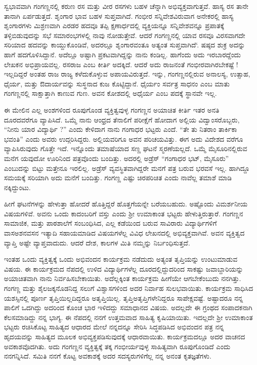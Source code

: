 {ಸ್ವಭಾವವಾಗಿ ಗಂಗಣ್ಣನಲ್ಲಿ ಕರುಣ ರಸ ಮತ್ತು ವೀರ ರಸಗಳು ಬಹಳ ಚೆನ್ನಾಗಿ ಅಭಿವ್ಯಕ್ತವಾಗುತ್ತವೆ. ಹಾಸ್ಯ ರಸ ತಾನೇ ತಾನಾಗಿ ಏರ್ಪಡುತ್ತದೆ. ಶೃಂಗಾರ ಭಾವ ಬಹಳ ಸುಪ್ತವಾಗಿದೆ. ಗಂಭೀರ ಸನ್ನಿವೇಶವಿರುವಾಗ ಅನೇಕರಲ್ಲಿ ಹಾಸ್ಯ ಶೃಂಗಾರಗಳು ಮಿಶ್ರಣವಾಗಿ ಎರಡರ ಹದವೂ ತಪ್ಪಿ ಕ್ಷಣಾರ್ಧದಲ್ಲಿ ವ್ಯಕ್ತಿಯನ್ನೂ ಸನ್ನಿವೇಶವನ್ನೂ ಪ್ರಪಾತಕ್ಕೆ ತಳ್ಳಿಬಿಡುವುದನ್ನು  ಸಭೆ ಸಮಾರಂಭಗಳಲ್ಲಿ ನಾವು ನೋಡುತ್ತೇವೆ. ಆದರೆ ಗಂಗಣ್ಣನಲ್ಲಿ ಯಾವ ರಸವೂ ವಿರಸವಾಗದೇ ಸರಿಯಾದ ಹದವನ್ನು ಕಾಯ್ದುಕೊಂಡಿವೆ, ಅದರಲ್ಲೂ ಶೃಂಗಾರವಂತೂ ಅತ್ಯಂತ ಸುಪ್ತವಾಗಿದೆ‘. ಷಷ್ಠದ ಶುಕ್ರ ಅದನ್ನು ಹಾಗೆ ಹದಗೊಳಿಸಿದ್ದಾನೆ.  ಅದೆಲ್ಲೂ ಅಷ್ಟಾಗಿ ಪ್ರಕಟವಾಗಿದ್ದನ್ನು ನಾನು ಕಂಡಿಲ್ಲ. ಹಾಗೆಂದು ಅದು ಇರಬಾರದ್ದೆಂದು ಲೇಖಕನ ಅಭಿಪ್ರಾಯವಲ್ಲ. ರಸರಾಜ ಎಂಬ ಕೀರ್ತಿ ಅದಕ್ಕಿದೆ. ಆದರೆ ಅದು ರಾಜನಂತೆ ಗಂಭೀರವಾಗಿರಬೇಕಷ್ಟೆ ! ಇಲ್ಲದಿದ್ದರೆ ಅಂತಹ ರಾಜ ರಾಜ್ಯ ಕಳೆದುಕೊಳ್ಳುವ ಅಪಾಯವಿರುತ್ತದೆ. ಇನ್ನು, ಗಂಗಣ್ಣನಲ್ಲಿರುವ ಅನಾಲಸ್ಯ, ಉತ್ಸಾಹ, ಧೈರ್ಯ, ಮತ್ತು ಔದಾರ್ಯವನ್ನು ಸುಸ್ಥನಾದ ಕುಜ ಕೊಟ್ಟಿದ್ದಾನೆ. ಧೈರ್ಯಂ ಸರ್ವತ್ರ ಸಾಧನಂ ಎಂಬ ಮಾತು ಗಂಗಣ್ಣನಲ್ಲಿ ಸಾಕ್ಷಾತ್ತಾಗಿ ಕಾಣುವ ಗುಣ. ಅವನ ಕೋಶದಲ್ಲಿ ಅಧೈರ್ಯ ಎಂಬ ಪದಕ್ಕೆ ಸ್ಥಾನವೇ ಇಲ್ಲ. 

ಈ ಮೇಲಿನ ಎಲ್ಲ ಅಂಶಗಳಿಂದ ರೂಪುಗೊಂಡ ವ್ಯಕ್ತಿತ್ವವುಳ್ಳ ಗಂಗಣ್ಣನ ಅಯಾಚಿತ ಕೀರ್ತಿ ಇತರ ಅನತಿ ದೂರದವರೆಗೂ ವ್ಯಾಪಿಸಿದೆ. ಒಮ್ಮೆ ನಾನು ಆಂಧ್ರದ ತೆನಾಲಿಗೆ ಪರೀಕ್ಷೆಗೆ ಹೋದಾಗ ಅಲ್ಲಿಯ ವಿದ್ವಾಂಸರೊಬ್ಬರು, “ನೀನು ಯಾರ ವಿದ್ಯಾರ್ಥಿ ?” ಎಂದು ಕೇಳಿದಾಗ ನಾನು ಗಂಗಾಧರ ಭಟ್ಟರು ಎಂದೆ. “ತೇ ತು ನಿತರಾಂ ತಾರ್ಕಿಕಾ ಭವಂತಿ” ಎಂದು ಅವರು ಉದ್ಗರಿಸಿದ್ದರು. ಅಲ್ಲಿಯವರಿಗೂ ಅವನ ಪರಿಚಯವಿತ್ತು. ಈಗ ಅದು ವಿದೇಶದ ವರೆಗೂ ವ್ಯಾಪಿಸಿರುವುದು ಗೊತ್ತೇ ಇದೆ.  ಇನ್ನೊಂದು ತಮಾಷೆಯಾದ ಸಣ್ಣ ಘಟನೆ ಸ್ಮರಣೆಯಲ್ಲದೆ. ಒಮ್ಮೆ ಮೈಸೂರಿನಲ್ಲಿರುವ ಮನೆಗ ಯವುದೋ ಊರಿನಿಂದ ಪತ್ರವೊಂದು ಬಂದಿತ್ತು. ಅದರಲ್ಲಿ ಅಡ್ರೆಸ್ \enginline{-} “ಗಂಗಾಧರ ಭಟ್, ಮೈಸೂರು” ಎಂಬುದನ್ನು ಬಿಟ್ಟು ಮತ್ತೇನೂ ಇರಲಿಲ್ಲ.  ಅಡ್ರೆಸ್ ವ್ಯವಸ್ಥಿತವಾಗಿದ್ದರೇ ಮನಗೆ ಪತ್ರ ಬರುವ ಭರವಸೆ ಇಲ್ಲ. ಹಾಗಿದ್ದೂ ಸಮಯಕ್ಕೆ ಸರಿಯಾಗಿ ಅದು ಮನೆಗೆ ಬಂದಿತ್ತು. ಗಂಗಣ್ಣ ಎಷ್ಟು ಚಿರಪರಿಚಿತ ಎಂದು ನಾವೆಲ್ಲ ತಮಾಶೆ ಮಾಡಿ ನಕ್ಕಿದ್ದುಂಟು. 

ಹೀಗೆ ಘಟನೆಗಳನ್ನು ಹೇಳುತ್ತಾ ಹೋದರೆ ಹೊತ್ತಿದ್ದರೆ ಹೊತ್ತಗೆಯನ್ನೇ ಬರೆಯಬಹುದು. ಅಷ್ಟೊಂದು ವಿಮರ್ಶನೀಯ ವಿಷಯಗಳಿವೆ. ಅವನು ಒಂದು ಕಾದಂಬರಿಗೆ ವಸ್ತು ಎಂದು ಶ್ರೀ ಉಮಾಕಾಂತ ಭಟ್ಟರು ಹೇಳುತ್ತಿರುತ್ತಾರೆ. ಗಂಗಣ್ಣನ ಸಾಮಾಜಿಕ, ಮತ್ತು ಪಾಠಶಾಲೆಗೆ ಸಂಬಂಧಿಸಿದ, ಎಲ್ಲ ಕಡೆಯಿಂದ ಬರುವ ಸಾವಿರಾರು ವಿದ್ಯಾರ್ಥಿಗಳಿಗೆ ವಾಸ\enginline{-}ಅಶನ\enginline{-}ವಸನ ಇತ್ಯಾದಿ ಸಹಾಯಮಾಡಿದ ವಿಷಯಗಳೆಲ್ಲ ವಿವಿಧ ಲೇಖನದಲ್ಲಿ ಅಭಿವ್ಯಕ್ತವಾಗಿವೆ. ಅವನ ವ್ಯಕ್ತಿತ್ವದ ವ್ಯಾಪ್ತಿ ಅಷ್ಟೇ ವ್ಯಾಪ್ತವಾದುದು. ಆದರೆ ದೇಶ, ಕಾಲಗಳ ಮಿತಿ ನಮ್ಮನ್ನು ನಿರ್ಬಂಧಿಸುತ್ತದೆ. 

ಇಂತಹ ಒಂದು ವ್ಯಕ್ತಿತ್ವಕ್ಕೆ ಒಂದು ಅಭಿವಂದನ ಕಾರ್ಯಕ್ರಮ ನಡೆದುದು ಅತ್ಯಂತ ತೃಪ್ತಿಯನ್ನು ಉಂಟುಮಾಡುವ ವಿಷಯ. ಈ ಕಾರ್ಯಕ್ರಮದ ನೆಪದಲ್ಲಿ ಉಳಿದ ವಿದ್ಯಾರ್ಥಿಗಳೆಲ್ಲ ದೂರದಲ್ಲಿದ್ದುದರಿಂದ ಸಾಕಷ್ಟು ಜವಾಬ್ದಾರಿಯನ್ನು ಅಯಾಚಿತವಾಗಿ ನಾನು ನಿರ್ವಹಿಸಬೇಕಾಯಿತು. ಅದೆಲ್ಲಕ್ಕಿಂತ ಕಾರ್ಯಕ್ರಮ ಹೀಗೆಯೇ ಆಗಬೇಕೆಂಬುದು ನನಗಿತ್ತು. ಗಂಗಣ್ಣ ಮತ್ತು ಶೈಲಜಕ್ಕನೊಡನಿದ್ದ ಸಲುಗೆ ವಿಶ್ವಾಸಗಳಿಂದ ಅದರ ನಿರ್ವಾಹ ಸುಲಭವಾಯಿತು. ಕಾರ್ಯಕ್ರಮ ಸಾಧಿಸಿದ ಯಶಸ್ಸಿನಲ್ಲಿ ಪೂರ್ಣ ತೃಪ್ತಿಯಿಲ್ಲದಿದ್ದರೂ  ಅತೃಪ್ತಿಯಿಲ್ಲ. ತೃಪ್ತಿ\enginline{-}ಅತೃಪ್ತಿಗಳೇನಿದ್ದರೂ ಸಾಪೇಕ್ಷವಷ್ಟೆ. ಅಷ್ಟಾದರೂ ನನ್ನ ಪಾಲಿಗೆ ಒದಗಿದ್ದು ಅದರಿಂದ ಕೊಂಚ ಭಾರ ಇಳಿದದ್ದು ಸಮಾಧಾನದ ವಿಷಯ. ಅದಲ್ಲದೇ ಈ ಗ್ರಂಥದ ಸಂಪಾದಕನಾಗಿ ಕೆಲಸಮಾಡಿದ್ದು ನನ್ನ ಭಾಗ್ಯ. ಈ ನೆಪದಲ್ಲಿ ನನಗೆ ಉತ್ತಮವಾದ ಸಾಹಿತ್ಯ ಕೃಷಿಯಾಯಿತು. ಇದಲ್ಲದೇ ಶ್ರೀ ಉಮಾಕಾಂತ ಭಟ್ಟರು ರಚಿಸಿಕೊಟ್ಟ  ಸಾಹಿತ್ಯದ ಆಧಾರದ ಮೇಲೆ ನನ್ನದನ್ನೂ ಸೇರಿಸಿ ಸಿದ್ಧಪಡಿಸಿದ ಅಭಿವಂದನ ಪತ್ರ ನನ್ನ ಹೃದಯವನ್ನು ಸಾಹಿತ್ಯದ ಮೂಲಕ ಅಭಿವ್ಯಕ್ತಪಡಿಸುವುದಕ್ಕೆ ಆಧಾರವಾಯಿತು. ಕಾರ್ಯಕ್ರಮದಲ್ಲೂ ಅದರ ವಾಚನದ ಅವಕಾಶವೊದಗಿತು. ಅದು ಗಂಗಣ್ಣನ ವ್ಯಕ್ತಿತ್ವಕ್ಕೆ ತಕ್ಕ ಗಂಭೀರ್ಯವುಳ್ಳ ಸಾಹಿತ್ಯವಾಗಿ ರೂಪುಗೊಂಡಿದೆ ಎಂದು ನನಗನ್ನಿಸಿದೆ. ಸಮಿತಿ  ನನಗೆ ಕೊಟ್ಟ ಅವಕಾಶಕ್ಕೆ ಅದರ ಸದಸ್ಯರುಗಳಿಗೆಲ್ಲ ನನ್ನ ಅನಂತ ಕೃತಜ್ಞತೆಗಳು. 

}
